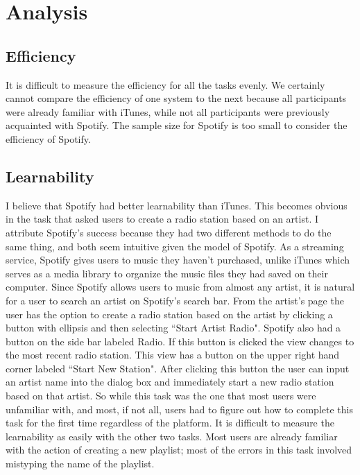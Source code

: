 \documentclass[11pt]{article}
\begin{document}
\section{Analysis}
\subsection{Efficiency}
It is difficult to measure the efficiency for all the tasks evenly. We certainly cannot compare the efficiency of one system to the next because all participants were already familiar with iTunes, while not all participants were previously acquainted with Spotify. The sample size for Spotify is too small to consider the efficiency of Spotify. 
\subsection{Learnability}
I believe that Spotify had better learnability than iTunes. This becomes obvious in the task that asked users to create a radio station based on an artist. I attribute Spotify's success because they had two different methods to do the same thing, and both seem intuitive given the model of Spotify. As a streaming service, Spotify gives users to music they haven't purchased, unlike iTunes which serves as a media library to organize the music files they had saved on their computer. Since Spotify allows users to music from almost any artist, it is natural for a user to search an artist on Spotify's search bar. From the artist's page the user has the option to create a radio station based on the artist by clicking a button with ellipsis and then selecting ``Start Artist Radio". Spotify also had a button on the side bar labeled Radio. If this button is clicked the view changes to the most recent radio station. This view has a button on the upper right hand corner labeled ``Start New Station". After clicking this button the user can input an artist name into the dialog box and immediately start a new radio station based on that artist. So while this task was the one that most users were unfamiliar with, and most, if not all, users had to figure out how to complete this task for the first time regardless of the platform. It is difficult to measure the learnability as easily with the other two tasks. Most users are already familiar with the action of creating a new playlist; most of the errors in this task involved mistyping the name of the playlist. 
\end{document}
